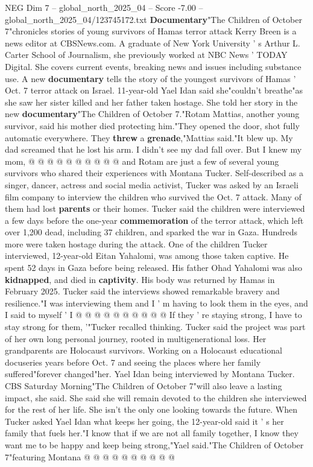 \begin{textsample}{NEG Dim 7 – global\_north\_2025\_04 – Score -7.00 – global\_north\_2025\_04/123745172.txt}  \label{ex:f7_neg_099}
\textbf{Documentary}"The Children of October 7"chronicles stories of young survivors of Hamas terror attack Kerry Breen is a news editor at CBSNews.com.
A graduate of New York University ' s Arthur L.
Carter School of Journalism, she previously worked at NBC News ' TODAY Digital.
She covers current events, breaking news and issues including substance use.
A new \textbf{documentary} tells the story of the youngest survivors of Hamas ' Oct. 7 terror attack on Israel. 11-year-old Yael Idan said she"couldn't breathe"as she saw her sister killed and her father taken hostage.
She told her story in the new \textbf{documentary}"The Children of October 7."Rotam Mattias, another young survivor, said his mother died protecting him."They opened the door, shot fully automatic everywhere.
They \textbf{threw} a \textbf{grenade},"Mattias said."It blew up.
My dad screamed that he lost his arm.
I didn't see my dad fall over.
But I knew my mom, @ @ @ @ @ @ @ @ @ @ and Rotam are just a few of several young survivors who shared their experiences with Montana Tucker.
Self-described as a singer, dancer, actress and social media activist, Tucker was asked by an Israeli film company to interview the children who survived the Oct. 7 attack.
Many of them had lost \textbf{parents} or their homes.
Tucker said the children were interviewed a few days before the one-year \textbf{commemoration} of the terror attack, which left over 1,200 dead, including 37 children, and sparked the war in Gaza.
Hundreds more were taken hostage during the attack.
One of the children Tucker interviewed, 12-year-old Eitan Yahalomi, was among those taken captive.
He spent 52 days in Gaza before being released.
His father Ohad Yahalomi was also \textbf{kidnapped}, and died in \textbf{captivity}.
His body was returned by Hamas in February 2025.
Tucker said the interviews showed remarkable bravery and resilience."I was interviewing them and I ' m having to look them in the eyes, and I said to myself ' I @ @ @ @ @ @ @ @ @ @ If they ' re staying strong, I have to stay strong for them, '"Tucker recalled thinking.
Tucker said the project was part of her own long personal journey, rooted in multigenerational loss.
Her grandparents are Holocaust survivors.
Working on a Holocaust educational docuseries years before Oct. 7 and seeing the places where her family suffered"forever changed"her.
Yael Idan being interviewed by Montana Tucker.
CBS Saturday Morning"The Children of October 7"will also leave a lasting impact, she said.
She said she will remain devoted to the children she interviewed for the rest of her life.
She isn't the only one looking towards the future.
When Tucker asked Yael Idan what keeps her going, the 12-year-old said it ' s her family that fuels her."I know that if we are not all family together, I know they want me to be happy and keep being strong,"Yael said."The Children of October 7"featuring Montana @ @ @ @ @ @ @ @ @ @

\end{textsample}
